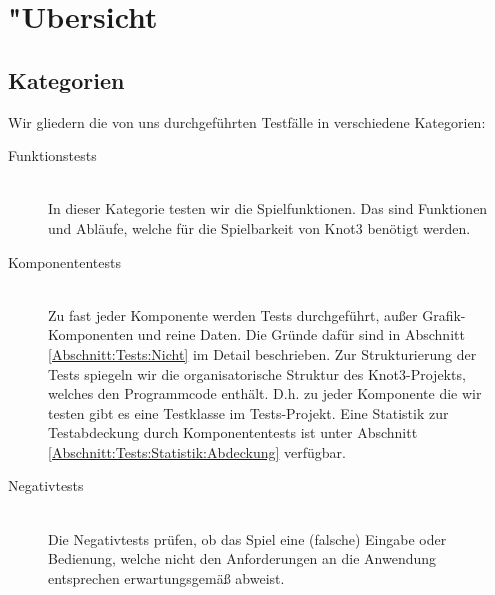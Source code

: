 %



\section{{"U}bersicht}
\label{Abschnitt:Tests:Uebersicht}



\subsection{Kategorien}
\label{Abschnitt:Tests:Uebersicht:Kategorien}

Wir gliedern die von uns durchgeführten Testfälle in verschiedene Kategorien:\\


\begin{description} %


	\item[Funktionstests] \hfill
	\\
	
	In dieser Kategorie testen wir die Spielfunktionen. Das sind Funktionen und Abläufe, welche für die Spielbarkeit von Knot3 benötigt werden.\\
	  
	
	\item[Komponententests] \hfill
	\\
	
	Zu fast jeder Komponente werden Tests durchgeführt, außer Grafik-Komponenten und reine Daten. Die Gründe dafür sind in Abschnitt \ref{Abschnitt:Tests:Nicht} im Detail beschrieben. Zur Strukturierung der Tests spiegeln wir die organisatorische Struktur des Knot3-Projekts, welches den Programmcode enthält. D.h. zu jeder Komponente die wir testen gibt es eine Testklasse im Tests-Projekt. Eine Statistik zur Testabdeckung durch Komponententests ist unter Abschnitt \ref{Abschnitt:Tests:Statistik:Abdeckung} verfügbar.\\


	\item[Negativtests] \hfill
	\\
	
	Die Negativtests prüfen, ob das Spiel eine (falsche) Eingabe oder Bedienung, welche nicht den Anforderungen an die Anwendung entsprechen erwartungsgemäß abweist. \\
	

\end{description}
